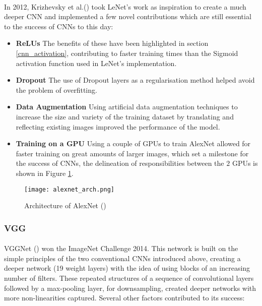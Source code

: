\paragraph{}
In 2012, Krizhevsky et al.(\cite{10.5555/2999134.2999257}) took LeNet's work as inspiration to create a much deeper \gls{CNN} and implemented a few novel contributions which are still essential to the success of \gls{CNN}s to this day:
\begin{itemize}
    \item \textbf{\gls{ReLU}s} The benefits of these have been highlighted in section \ref{cnn_activation}, contributing to faster training times than the Sigmoid activation function used in LeNet's implementation.
    \item \textbf{Dropout} The use of Dropout layers as a regularisation method helped avoid the problem of overfitting.
    \item \textbf{Data Augmentation} Using artificial data augmentation techniques to increase the size and variety of the training dataset by translating and reflecting existing images improved the performance of the model.
     \item \textbf{Training on a \gls{GPU}} Using a couple of \gls{GPU}s to train AlexNet allowed for faster training on great amounts of larger images, which set a milestone for the success of \gls{CNN}s, the delineation of responsibilities between the $2$ \gls{GPU}s is shown in Figure \ref{fig_alexnet}.
\end{itemize}

    \begin{figure}[hbt!]
        \centering
        \texttt{[image: alexnet\_arch.png]}
        \caption{Architecture of AlexNet (\cite{10.5555/2999134.2999257})}
        \label{fig_alexnet}
    \end{figure}


\subsubsection{VGG}
\paragraph{}
VGGNet (\cite{simonyan2014deep}) won the ImageNet Challenge 2014. This network is built on the simple principles of the two conventional \gls{CNN}s introduced above, creating a deeper network (19 weight layers) with the idea of using blocks of an increasing number of filters. These repeated structures of a sequence of convolutional layers followed by a max-pooling layer, for downsampling, created deeper networks with more non-linearities captured. Several other factors contributed to its success:

